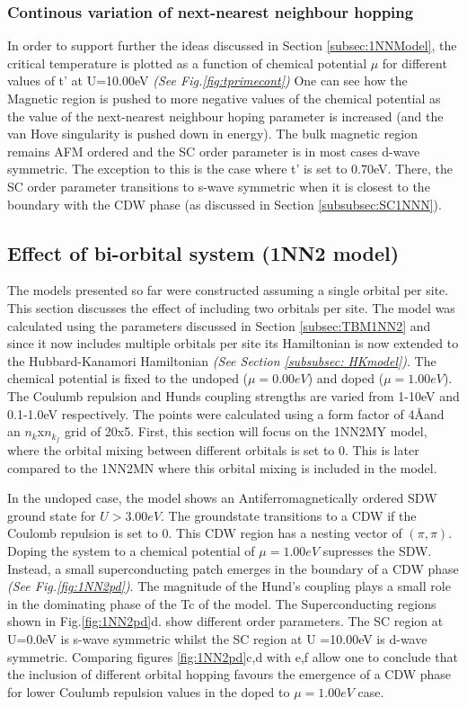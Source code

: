 \documentclass[12pt]{article}
\begin{document}
\subsubsection{Continous variation of next-nearest neighbour hopping}

In order to support further the ideas discussed in Section \ref{subsec:1NNModel}, the critical temperature
is plotted as a function of chemical potential $\mu$ for different values of t' at U=10.00eV \textit{(See Fig.\ref{fig:tprimecont})}
One can see how the Magnetic region is pushed to more negative values of the chemical potential as the value of the next-nearest 
neighbour hoping parameter is increased (and the van Hove singularity is pushed down in energy). The bulk magnetic
region remains AFM ordered and the SC order parameter is in most cases d-wave symmetric. The exception to this is the case where
t' is set to 0.70eV. There, the SC order parameter transitions to s-wave symmetric when it is closest to the boundary 
with the CDW phase (as discussed in Section \ref{subsubsec:SC1NNN}).

\subsection{Effect of bi-orbital system (1NN2 model)}
\label{subsec:1NN2Model}

The models presented so far were constructed assuming a single orbital per site. This section discusses the effect of including
two orbitals per site. The model was calculated using the parameters discussed in Section \ref{subsec:TBM1NN2} and since it now includes
multiple orbitals per site its Hamiltonian is now extended to the Hubbard-Kanamori Hamiltonian \textit{(See Section \ref{subsubsec: HKmodel})}. 
The chemical potential is fixed to the undoped ($\mu = 0.00eV $) and doped ($\mu =1.00eV$). The Coulumb repulsion and Hunds coupling strengths are varied from 1-10eV and 0.1-1.0eV respectively.
The points were calculated using a form factor of 4\AA and an $n_k$x$n_{k_f}$ grid of 20x5. 
First, this section will focus on the 1NN2MY model, where the orbital mixing between different orbitals is set to 0. This is later compared
to the 1NN2MN where this orbital mixing is included in the model. \par
\medskip
\noindent In the undoped case, the model shows an Antiferromagnetically ordered SDW ground state
for $U > 3.00eV$. The groundstate transitions to a CDW if the Coulomb repulsion is set to 0. This CDW region has a nesting vector 
of $(\pi, \pi)$. Doping the system to a chemical potential of $\mu = 1.00eV$ supresses the SDW. Instead, a small superconducting patch 
emerges in the boundary of a CDW phase \textit{(See Fig.{\ref{fig:1NN2pd}})}. The magnitude of the Hund's coupling plays a small role in the dominating phase of the Tc of the model. The Superconducting regions shown in Fig.\ref{fig:1NN2pd}d. show different order parameters. The SC region at U=0.0eV is s-wave symmetric whilst the SC region at U =10.00eV
is d-wave symmetric. Comparing figures \ref{fig:1NN2pd}c,d with e,f allow one to conclude that the inclusion of
different orbital hopping favours the emergence of a CDW phase for lower Coulumb repulsion values in the doped to $\mu = 1.00eV$ case. 
\end{document}
